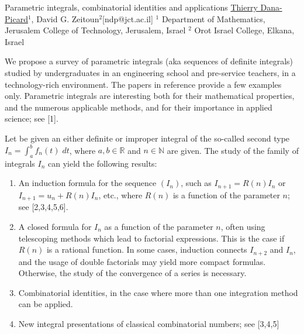 


\begin{abstract_online}{Parametric integrals, combinatorial identities and applications}{%
        \underline{Thierry Dana-Picard}$^{1}$, David G. Zeitoun$^{2}$}{[ndp@jct.ac.il]
        }{%
        $^1$ Department of Mathematics, Jerusalem College of Technology, Jerusalem, Israel \newline{}$^2$ Orot Israel College, Elkana, Israel \newline{}}

We propose a survey of parametric integrals (aka sequences of definite integrals) studied by undergraduates in an engineering school and pre-service teachers, in a technology-rich environment.  The papers in reference provide a few examples only. Parametric integrals are interesting both for their mathematical properties, and the numerous applicable methods, and for their importance in applied science; see [1].

Let be given an either definite or improper integral of the so-called second type $I_n=\int_a^b f_n(t) \; dt$, where $a,b \in \mathbb{R}$ and $n \in \mathbb{N}$ are given. The study of the family of integrals $I_n$ can yield the following results:
\begin{enumerate}
\item An induction formula for the sequence $(I_n)$, such as $I_{n+1}=R(n)I_n$ or $I_{n+1}=u_n+R(n)I_n$, etc., where $R(n)$ is a function of the parameter $n$; see [2,3,4,5,6].
\item A closed formula for $I_n$ as a function of the parameter $n$, often using telescoping methods which lead to factorial expressions. This is the case if $R(n)$ is a rational function. In some cases, induction connects $I_{n+2}$ and $I_n$, and the usage of double factorials may yield more compact formulas. Otherwise, the study of the convergence of a series is necessary.
\item Combinatorial identities, in the case where more than one integration method can be applied.
\item New integral presentations of classical combinatorial numbers; see [3,4,5]
\end{enumerate}


\end{abstract_online}
